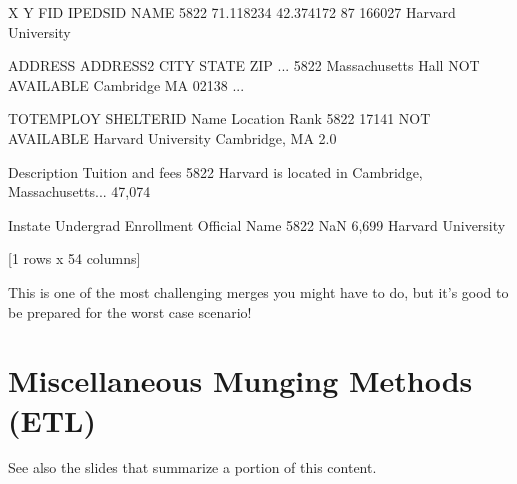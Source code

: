 \documentclass[letterpaper,10pt,english]{jupyterBook}
\begin{document}
\begin{sphinxVerbatim}[commandchars=\\\{\}]
\PYG{p}{[}\PYG{p}{[}\PYG{p}{]}  \PYG{p}{]}
\end{sphinxVerbatim}

\begin{sphinxVerbatim}[commandchars=\\\{\}]
              X          Y  FID  IPEDSID                NAME  \PYGZbs{}
5822 \PYGZhy{}71.118234  42.374172   87   166027  Harvard University   

                 ADDRESS       ADDRESS2       CITY STATE    ZIP  ...  \PYGZbs{}
5822  Massachusetts Hall  NOT AVAILABLE  Cambridge    MA  02138  ...   

     TOT\PYGZus{}EMPLOY     SHELTER\PYGZus{}ID                Name       Location  Rank  \PYGZbs{}
5822      17141  NOT AVAILABLE  Harvard University  Cambridge, MA   2.0   

                                            Description  Tuition and fees  \PYGZbs{}
5822  Harvard is located in Cambridge, Massachusetts...          \PYGZdl{}47,074    

     In\PYGZhy{}state  Undergrad Enrollment       Official Name  
5822      NaN                 6,699  Harvard University  

[1 rows x 54 columns]
\end{sphinxVerbatim}

\sphinxAtStartPar
This is one of the most challenging merges you might have to do, but it’s good to be prepared for the worst case scenario!


\chapter{Miscellaneous Munging Methods (ETL)}
\label{\detokenize{chapter-13-etl:miscellaneous-munging-methods-etl}}\label{\detokenize{chapter-13-etl::doc}}
\sphinxAtStartPar
See also the slides that summarize a portion of this content.
\end{document}
